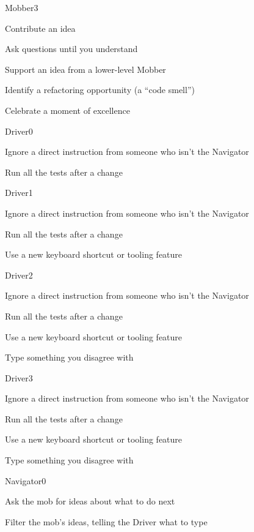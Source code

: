 \documentclass[20pt]{extarticle}
\begin{document}
\begin{role}{Mobber}{3}
  \item Contribute an idea
  \item Ask questions until you understand
  \item Support an idea from a lower-level Mobber
  \item Identify a refactoring opportunity (a ``code smell'')
  \item Celebrate a moment of excellence
\end{role}



\begin{role}{Driver}{0}
  \item Ignore a direct instruction from someone who isn't the Navigator
  \item Run all the tests after a change
\end{role}

\begin{role}{Driver}{1}
  \item Ignore a direct instruction from someone who isn't the Navigator
  \item Run all the tests after a change
  \item Use a new keyboard shortcut or tooling feature
\end{role}

\begin{role}{Driver}{2}
  \item Ignore a direct instruction from someone who isn't the Navigator
  \item Run all the tests after a change
  \item Use a new keyboard shortcut or tooling feature
  \item Type something you disagree with
\end{role}

\begin{role}{Driver}{3}
  \item Ignore a direct instruction from someone who isn't the Navigator
  \item Run all the tests after a change
  \item Use a new keyboard shortcut or tooling feature
  \item Type something you disagree with
\end{role}


\begin{role}{Navigator}{0}
  \item Ask the mob for ideas about what to do next
  \item Filter the mob's ideas, telling the Driver what to type
\end{role}
\end{document}
